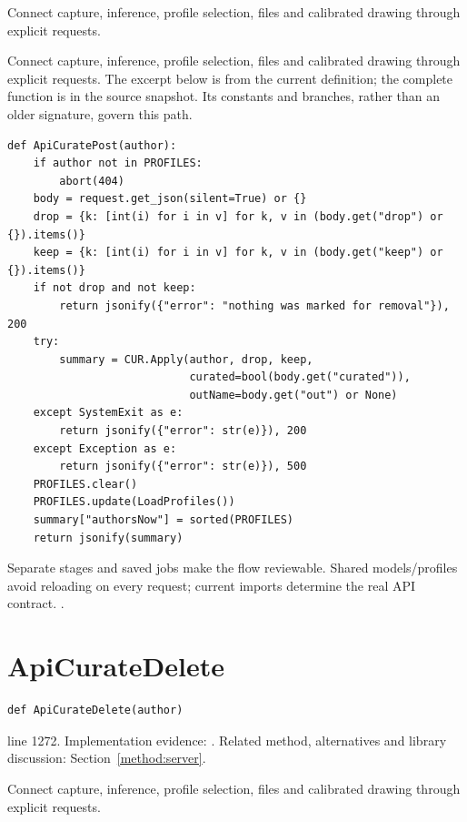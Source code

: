 Connect capture, inference, profile selection, files and calibrated drawing through explicit requests.


Connect capture, inference, profile selection, files and calibrated drawing through explicit requests. The excerpt below is from the current definition; the complete function is in the source snapshot. Its constants and branches, rather than an older signature, govern this path.


\begin{lstlisting}[style=plain]
def ApiCuratePost(author):
    if author not in PROFILES:
        abort(404)
    body = request.get_json(silent=True) or {}
    drop = {k: [int(i) for i in v] for k, v in (body.get("drop") or {}).items()}
    keep = {k: [int(i) for i in v] for k, v in (body.get("keep") or {}).items()}
    if not drop and not keep:
        return jsonify({"error": "nothing was marked for removal"}), 200
    try:
        summary = CUR.Apply(author, drop, keep,
                            curated=bool(body.get("curated")),
                            outName=body.get("out") or None)
    except SystemExit as e:
        return jsonify({"error": str(e)}), 200
    except Exception as e:
        return jsonify({"error": str(e)}), 500
    PROFILES.clear()
    PROFILES.update(LoadProfiles())
    summary["authorsNow"] = sorted(PROFILES)
    return jsonify(summary)
\end{lstlisting}
Separate stages and saved jobs make the flow reviewable. Shared models/profiles avoid reloading on every request; current imports determine the real API contract. \cite{flaskdocs,pillowops,code2026}.


\section{ApiCurateDelete}\label{fn:web-server:ApiCurateDelete}
\begin{lstlisting}[style=sig]
def ApiCurateDelete(author)
\end{lstlisting}
 line 1272. Implementation evidence: \cite{code2026}. Related method, alternatives and library discussion: Section~\ref{method:server}.


Connect capture, inference, profile selection, files and calibrated drawing through explicit requests.



